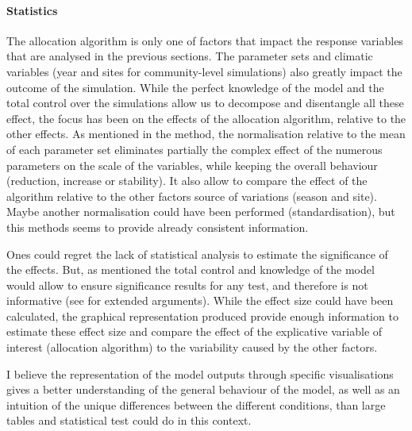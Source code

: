 





\paragraph{Statistics}

The allocation algorithm is only one of factors that impact the response variables that are analysed in the previous sections. The parameter sets and climatic variables (year and sites for community-level simulations) also greatly impact the outcome of the simulation. While the perfect knowledge of the model and the total control over the simulations allow us to decompose and disentangle all these effect, the focus has been on the effects of the allocation algorithm, relative to the other effects. As mentioned in the method, the normalisation relative to the mean of each parameter set eliminates partially the complex effect of the numerous parameters on the scale of the variables, while keeping the overall behaviour (reduction, increase or stability). It also allow to compare the effect of the algorithm relative to the other factors source of variations (season and site). Maybe another normalisation could have been performed (standardisation), but this methods seems to provide already consistent information.

Ones could regret the lack of statistical analysis to estimate the significance of the effects. But, as mentioned the total control and knowledge of the model would allow to ensure significance results for any test, and therefore is not informative (see \cite{white_ecologists_2014} for extended arguments). While the effect size could have been calculated, the graphical representation produced provide enough information to estimate these effect size and compare the effect of the explicative variable of interest (allocation algorithm) to the variability caused by the other factors. 

I believe the representation of the model outputs through specific visualisations gives a better understanding of the general behaviour of the model, as well as an intuition of the unique differences between the different conditions, than large tables and statistical test could do in this context. 

